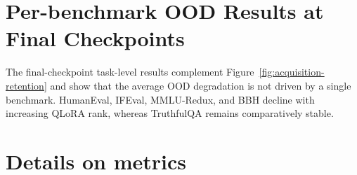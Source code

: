 \documentclass[11pt]{article}
\begin{document}
\section{Per-benchmark OOD Results at Final Checkpoints}
\label{app:ood-breakdown}

\begin{table}[t]
\centering
{}
\caption{\textbf{Per-benchmark OOD scores at the final checkpoint (mean $\pm$
standard deviation over five seeds).} Degradation is broad on HumanEval,
IFEval, MMLU-Redux, and BBH;
TruthfulQA is comparatively stable.}
\label{tab:ood-breakdown}
\end{table}

The final-checkpoint task-level results complement Figure~\ref{fig:acquisition-retention}
and show that the average OOD degradation is not driven by a single benchmark.
HumanEval, IFEval, MMLU-Redux, and BBH decline with increasing QLoRA rank,
whereas TruthfulQA remains comparatively stable. 


\section{Details on metrics}
\label{app:metrics}
\end{document}
